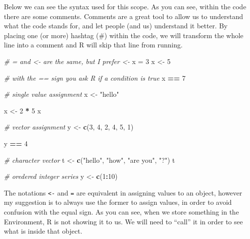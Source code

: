 \documentclass[
]{article}
\newenvironment{Shaded}{\begin{snugshade}}{\end{snugshade}}
\newcommand{\CommentTok}[1]{\textcolor[rgb]{0.56,0.35,0.01}{\textit{#1}}}
\newcommand{\DecValTok}[1]{\textcolor[rgb]{0.00,0.00,0.81}{#1}}
\newcommand{\FunctionTok}[1]{\textcolor[rgb]{0.13,0.29,0.53}{\textbf{#1}}}
\newcommand{\NormalTok}[1]{#1}
\newcommand{\OtherTok}[1]{\textcolor[rgb]{0.56,0.35,0.01}{#1}}
\newcommand{\SpecialCharTok}[1]{\textcolor[rgb]{0.81,0.36,0.00}{\textbf{#1}}}
\newcommand{\StringTok}[1]{\textcolor[rgb]{0.31,0.60,0.02}{#1}}
\begin{document}
Below we can see the syntax used for this scope. As you can see, within
the code there are some comments. Comments are a great tool to allow us
to understand what the code stands for, and let people (and us)
understand it better. By placing one (or more) hashtag (\#) within the
code, we will transform the whole line into a comment and R will skip
that line from running.

\begin{Shaded}
\begin{Highlighting}[]
\CommentTok{\# = and \textless{}{-} are the same, but I prefer \textless{}{-} }
\NormalTok{x }\OtherTok{=} \DecValTok{3}
\NormalTok{x }\OtherTok{\textless{}{-}} \DecValTok{5}

\CommentTok{\# with the == sign you ask R if a condition is true}
\NormalTok{x }\SpecialCharTok{==} \DecValTok{7}

\CommentTok{\# single value assignment}
\NormalTok{x }\OtherTok{\textless{}{-}} \StringTok{"hello"}

\NormalTok{x }\OtherTok{\textless{}{-}} \DecValTok{2} \SpecialCharTok{*} \DecValTok{5}
\NormalTok{x}

\CommentTok{\# vector assignment}
\NormalTok{y }\OtherTok{\textless{}{-}} \FunctionTok{c}\NormalTok{(}\DecValTok{3}\NormalTok{, }\DecValTok{4}\NormalTok{, }\DecValTok{2}\NormalTok{, }\DecValTok{4}\NormalTok{, }\DecValTok{5}\NormalTok{, }\DecValTok{1}\NormalTok{)}

\NormalTok{y }\SpecialCharTok{==} \DecValTok{4}

\CommentTok{\# character vector}
\NormalTok{t }\OtherTok{\textless{}{-}} \FunctionTok{c}\NormalTok{(}\StringTok{"hello"}\NormalTok{, }\StringTok{"how"}\NormalTok{, }\StringTok{"are you"}\NormalTok{, }\StringTok{"?"}\NormalTok{)}
\NormalTok{t}

\CommentTok{\# oredered integer series}
\NormalTok{y }\OtherTok{\textless{}{-}} \FunctionTok{c}\NormalTok{(}\DecValTok{1}\SpecialCharTok{:}\DecValTok{10}\NormalTok{)}
\end{Highlighting}
\end{Shaded}

The notations \texttt{\textless{}-} and \texttt{=} are equivalent in assigning values to an
object, however my suggestion is to always use the former to assign
values, in order to avoid confusion with the equal sign. As you can see,
when we store something in the Environment, R is not showing it to us.
We will need to ``call'' it in order to see what is inside that object.
\end{document}
